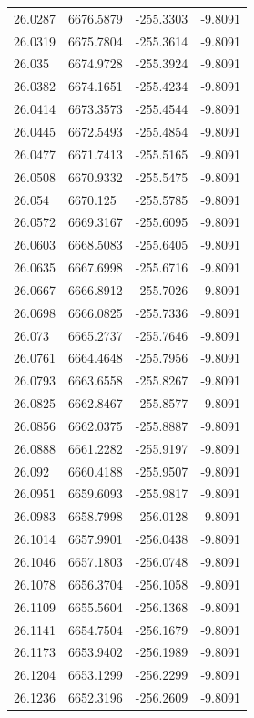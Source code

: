 \begin{table}[H]
\begin{tabular}{llll}
26.0287 & 6676.5879 & -255.3303 & -9.8091 \\
26.0319 & 6675.7804 & -255.3614 & -9.8091 \\
26.035 & 6674.9728 & -255.3924 & -9.8091 \\
26.0382 & 6674.1651 & -255.4234 & -9.8091 \\
26.0414 & 6673.3573 & -255.4544 & -9.8091 \\
26.0445 & 6672.5493 & -255.4854 & -9.8091 \\
26.0477 & 6671.7413 & -255.5165 & -9.8091 \\
26.0508 & 6670.9332 & -255.5475 & -9.8091 \\
26.054 & 6670.125 & -255.5785 & -9.8091 \\
26.0572 & 6669.3167 & -255.6095 & -9.8091 \\
26.0603 & 6668.5083 & -255.6405 & -9.8091 \\
26.0635 & 6667.6998 & -255.6716 & -9.8091 \\
26.0667 & 6666.8912 & -255.7026 & -9.8091 \\
26.0698 & 6666.0825 & -255.7336 & -9.8091 \\
26.073 & 6665.2737 & -255.7646 & -9.8091 \\
26.0761 & 6664.4648 & -255.7956 & -9.8091 \\
26.0793 & 6663.6558 & -255.8267 & -9.8091 \\
26.0825 & 6662.8467 & -255.8577 & -9.8091 \\
26.0856 & 6662.0375 & -255.8887 & -9.8091 \\
26.0888 & 6661.2282 & -255.9197 & -9.8091 \\
26.092 & 6660.4188 & -255.9507 & -9.8091 \\
26.0951 & 6659.6093 & -255.9817 & -9.8091 \\
26.0983 & 6658.7998 & -256.0128 & -9.8091 \\
26.1014 & 6657.9901 & -256.0438 & -9.8091 \\
26.1046 & 6657.1803 & -256.0748 & -9.8091 \\
26.1078 & 6656.3704 & -256.1058 & -9.8091 \\
26.1109 & 6655.5604 & -256.1368 & -9.8091 \\
26.1141 & 6654.7504 & -256.1679 & -9.8091 \\
26.1173 & 6653.9402 & -256.1989 & -9.8091 \\
26.1204 & 6653.1299 & -256.2299 & -9.8091 \\
26.1236 & 6652.3196 & -256.2609 & -9.8091 \\

\end{tabular}
\end{table}
